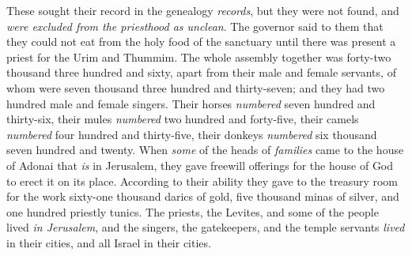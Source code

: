 \begin{biblechapter}
\verse These sought their record in the genealogy \textit{records}, but they were not found, and \textit{were excluded from the priesthood as unclean}.
\verse The governor said to them that they could not eat from the holy food of the sanctuary until there was present a priest for the Urim and Thummim.
\verse The whole assembly together was forty-two thousand three hundred and sixty,
\verse apart from their male and female servants, of whom were seven thousand three hundred and thirty-seven; and they had two hundred male and female singers.
\verse Their horses \textit{numbered} seven hundred and thirty-six, their mules \textit{numbered} two hundred and forty-five,
\verse their camels \textit{numbered} four hundred and thirty-five, their donkeys \textit{numbered} six thousand seven hundred and twenty.
 When \textit{some} of the heads of \textit{families} came to the house of Adonai that \textit{is} in Jerusalem, they gave freewill offerings for the house of God to erect it on its place.
\verse According to their ability they gave to the treasury room for the work sixty-one thousand darics of gold, five thousand minas of silver, and one hundred priestly tunics.
\verse The priests, the Levites, and some of the people lived \textit{in Jerusalem}, and the singers, the gatekeepers, and the temple servants \textit{lived} in their cities, and all Israel in their cities.
\end{biblechapter}

